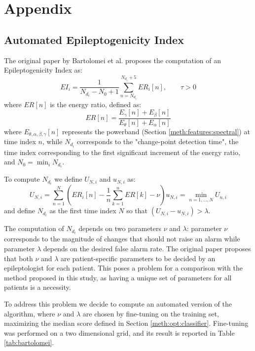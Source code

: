 \section*{Appendix}

\subsection{Automated Epileptogenicity Index}   \label{app:bartolomei}

The original paper by Bartolomei et al. \cite{bartolomei} proposes the
computation of an Epileptogenicity Index as:
\begin{equation}
    EI_i = \frac{1}{N_{d_i} - N_0 + 1}
    \sum_{n = N_{d_i}}^{N_{d_i} + 5} ER_i[n],
    \qquad \tau > 0
\end{equation}
where $ER[n]$ is the energy ratio, defined as:
\begin{equation}
    ER[n]=\frac{E_\gamma[n]+E_\beta[n]}{E_\theta[n]+E_\alpha[n]}
\end{equation}
where $E_{\theta,\alpha,\beta,\gamma}[n]$ represents the powerband
(Section \ref{meth:features:spectral}) at time index $n$,
while $N_{d_i}$ corresponds to the "change-point detection time", the time index
corresponding to the first significant increment of the energy ratio, and
$N_0=\min_{i}N_{d_i}$.

To compute $N_{d_i}$ we define $U_{N,i}$ and $u_{N,i}$ as:
\begin{equation}
    U_{N,i} = \sum_{n=1}^{N} \left( ER_i[n] - \frac{1}{n} \sum_{k=1}^{n} ER[k] - \nu \right)  
    u_{N,i} = \min_{n=1,\dots,N} U_{n,i}
\end{equation}
and define $N_{d_i}$ as the first time index $N$ so that $(U_{N,i}-u_{N,i})>\lambda$.

The computation of $N_{d_i}$ depends on two parameters $\nu$ and $\lambda$:
parameter $\nu$ corresponds to the magnitude of changes that
should not raise an alarm while parameter $\lambda$ depends on the desired false
alarm rate.
The original paper proposes that both $\nu$ and $\lambda$ are patient-specific
parameters to be decided by an epileptologist for each patient.
This poses a problem for a comparison with the method proposed in this study,
as having a unique set of parameters for all patients is a necessity.

To address this problem we decide to compute an automated version of the
algorithm, where $\nu$ and $\lambda$ are chosen by fine-tuning on the training set,
maximizing the median score defined in Section \ref{meth:opt:classifier}.
Fine-tuning was performed on a two dimensional grid, and its result is reported
in Table \ref{tab:bartolomei}.

